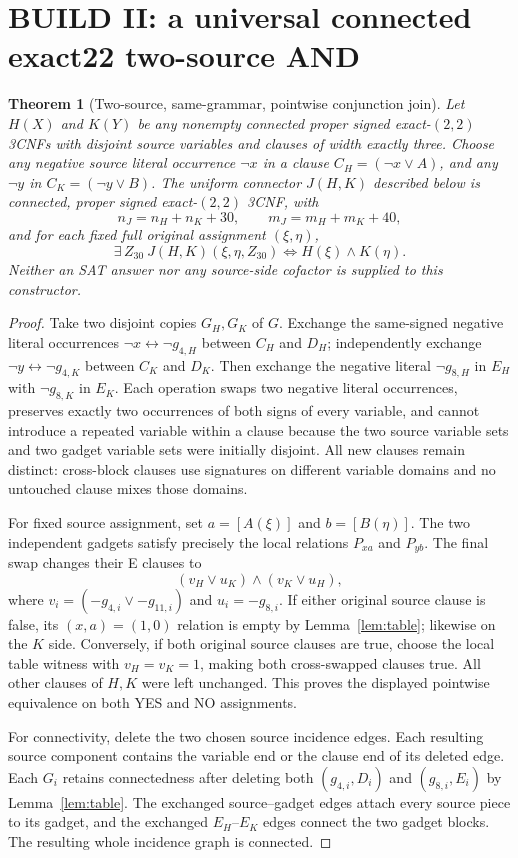 \documentclass[10pt]{article}
\newtheorem{theorem}{Theorem}
\begin{document}
\section{BUILD II: a universal connected exact22 two-source AND}
\begin{theorem}[Two-source, same-grammar, pointwise conjunction join]\label{thm:join}
Let $H(X)$ and $K(Y)$ be \emph{any} nonempty connected proper signed exact-$(2,2)$ 3CNFs with disjoint source variables and clauses of width exactly three. Choose any negative source literal occurrence $\neg x$ in a clause $C_H=(\neg x\vee A)$, and any $\neg y$ in $C_K=(\neg y\vee B)$. The uniform connector $J(H,K)$ described below is connected, proper signed exact-$(2,2)$ 3CNF, with
\[
 n_J=n_H+n_K+30,\qquad m_J=m_H+m_K+40,
\]
and \emph{for each fixed full original assignment} $(\xi,\eta)$,
\[
 \boxed{\exists\,Z_{30}\ J(H,K)(\xi,\eta,Z_{30})\iff H(\xi)\land K(\eta).}
\]
Neither an SAT answer nor any source-side cofactor is supplied to this constructor.
\end{theorem}
\begin{proof}
Take two disjoint copies $G_H,G_K$ of $G$. Exchange the same-signed negative literal occurrences $\neg x\leftrightarrow\neg g_{4,H}$ between $C_H$ and $D_H$; independently exchange $\neg y\leftrightarrow\neg g_{4,K}$ between $C_K$ and $D_K$. Then exchange the negative literal $\neg g_{8,H}$ in $E_H$ with $\neg g_{8,K}$ in $E_K$. Each operation swaps two negative literal occurrences, preserves exactly two occurrences of both signs of every variable, and cannot introduce a repeated variable within a clause because the two source variable sets and two gadget variable sets were initially disjoint. All new clauses remain distinct: cross-block clauses use signatures on different variable domains and no untouched clause mixes those domains.

For fixed source assignment, set $a=[A(\xi)]$ and $b=[B(\eta)]$. The two independent gadgets satisfy precisely the local relations $P_{xa}$ and $P_{yb}$. The final swap changes their E clauses to
\[
 (v_H\vee u_K)\land(v_K\vee u_H),
\]
where $v_i=(-g_{4,i}\vee-g_{11,i})$ and $u_i=-g_{8,i}$. If either original source clause is false, its $(x,a)=(1,0)$ relation is empty by Lemma~\ref{lem:table}; likewise on the $K$ side. Conversely, if both original source clauses are true, choose the local table witness with $v_H=v_K=1$, making both cross-swapped clauses true. All other clauses of $H,K$ were left unchanged. This proves the displayed pointwise equivalence on both YES and NO assignments.

For connectivity, delete the two chosen source incidence edges. Each resulting source component contains the variable end or the clause end of its deleted edge. Each $G_i$ retains connectedness after deleting both $(g_{4,i},D_i)$ and $(g_{8,i},E_i)$ by Lemma~\ref{lem:table}. The exchanged source--gadget edges attach every source piece to its gadget, and the exchanged $E_H$--$E_K$ edges connect the two gadget blocks. The resulting whole incidence graph is connected.\end{proof}
\end{document}
